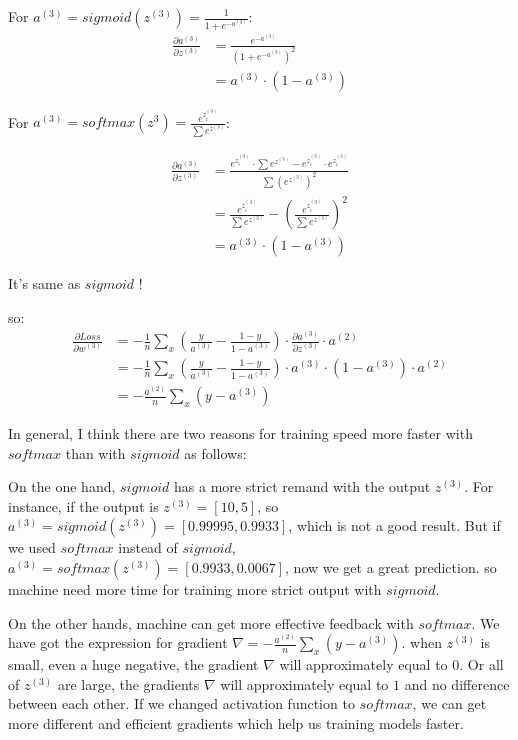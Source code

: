 \documentclass[a4paper,10pt]{article}
\begin{document}
For $a^{(3)}=sigmoid(z^{(3)})=\frac{1}{1+e^{-a^{(3)}}}$:
\begin{equation*}
    \begin{split}
    \frac{\partial a^{(3)}}{\partial z^{(3)}} &= \frac{e^{-a^{(3)}}}{(1+e^{-a^(3)})^2} \\
    &= a^{(3)} \cdot (1-a^{(3)})
    \end{split}
\end{equation*}

For $a^{(3)}=softmax(z^{3})=\frac{e^{z_i^{(3)}}}{\sum e^{z^{(3)}}}$:

\begin{equation*}
    \begin{split}
    \frac{\partial a^{(3)}}{\partial z^{(3)}} &= \frac{e^{z_i^{(3)}} \cdot \sum e^{z^{(3)}} - e^{z_i^{(3)}} \cdot e^{z_i^{(3)}}}{\sum (e^{z^{(3)}})^2} \\
    &= \frac{e^{z_i^{(3)}}}{\sum e^{z^{(3)}}} - (\frac{e^{z_i^{(3)}}}{\sum e^{z^{(3)}}})^2 \\
    &= a^{(3)} \cdot (1-a^{(3)}) 
    \end{split}
\end{equation*}

It's same as $sigmoid$ !

so:
\begin{equation*}
    \begin{split}
    \frac{\partial Loss}{\partial w^{(3)}} &=  -\frac{1}{n}\sum_{x}(\frac{y}{a^{(3)}}-\frac{1-y}{1-a^{(3)}}) \cdot \frac{\partial a^{(3)}}{\partial z^{(3)}} \cdot a^{(2)} \\
    &= -\frac{1}{n}\sum_{x}(\frac{y}{a^{(3)}}-\frac{1-y}{1-a^{(3)}}) \cdot a^{(3)} \cdot (1-a^{(3)}) \cdot a^{(2)} \\
    &= -\frac{a^{(2)}}{n}\sum_{x}(y-a^{(3)})
    \end{split}
\end{equation*}

In general, I think there are two reasons for training speed more faster with $softmax$ than with $sigmoid$ as follows:

On the one hand, $sigmoid$ has a more strict remand with the output $z^{(3)}$. For instance, if the output is $z^{(3)} = [10, 5] $, so $a^{(3)}=sigmoid(z^{(3)})=[0.99995, 0.9933]$, which is not a good result. But if we used $softmax$ instead of $sigmoid$, $a^{(3)}=softmax(z^{(3)})=[0.9933, 0.0067]$, now we get a great prediction. so machine need more time for training more strict output with $sigmoid$.

On the other hands, machine can get more effective feedback with $softmax$. We have got the expression for gradient $\nabla=-\frac{a^{(2)}}{n}\sum_{x}(y-a^{(3)})$. when $z^{(3)}$ is small, even a huge negative, the gradient $\nabla$ will approximately equal to $0$. Or all of $z^{(3)}$ are large, the gradients $\nabla$ will approximately equal to $1$ and no difference between each other. If we changed activation function to $softmax$, we can get more different and efficient gradients which help us training models faster.
\end{document}

